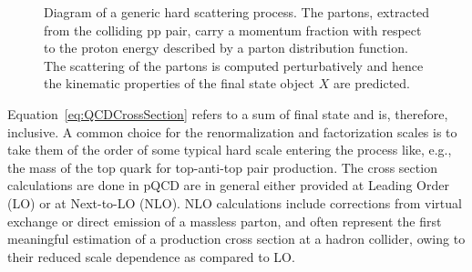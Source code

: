 
\begin{figure}[hbt]\begin{center}
        \myskip\myskip
	\caption{Diagram of a generic hard scattering process. The partons, extracted from the colliding pp pair,
  carry a momentum fraction with respect to the proton energy described by a parton distribution function. 
  The scattering of the partons is computed perturbatively and hence the kinematic properties of the final state object $X$ are predicted. \label{fig:hardscatter}}
\end{center}\end{figure}

Equation~\ref{eq:QCDCrossSection} refers to a sum of final state and is, therefore, inclusive. A common choice for the 
renormalization and factorization scales is to take them of the order of some typical hard scale 
entering the process like, e.g., the mass of the top quark for top-anti-top pair production.
The cross section calculations are done in pQCD are in general either provided at Leading Order (LO) 
or at Next-to-LO (NLO). NLO calculations include corrections from virtual exchange or direct 
emission of a massless parton, and often represent the first meaningful estimation of a production
cross section at a hadron collider,
owing to their reduced scale dependence as compared to LO.


